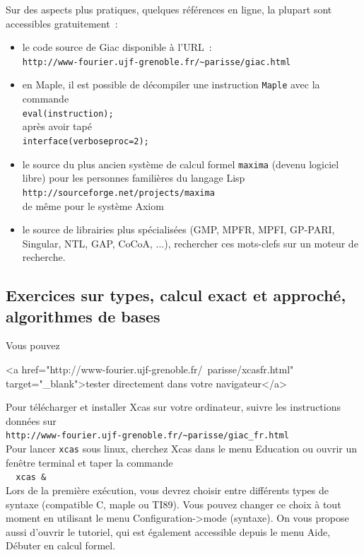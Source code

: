 \documentclass[a4paper,11pt]{article}
\begin{document}
\begin{giacjshere}
Sur des aspects plus pratiques, quelques r\'ef\'erences en ligne, 
la plupart sont accessibles  gratuitement~:
\begin{itemize}
\item le code source de Giac disponible à l'URL~:\\
\verb|http://www-fourier.ujf-grenoble.fr/~parisse/giac.html|
\item en Maple, il est possible de
décompiler une instruction \verb|Maple| avec la commande\\
\verb|eval(instruction);|\\
après avoir tapé\\
\verb|interface(verboseproc=2);|
\item le source du plus ancien système de calcul formel \verb|maxima|
(devenu logiciel libre) pour les personnes famili\`eres du langage Lisp\\
\verb|http://sourceforge.net/projects/maxima|\\
de m\^eme pour le syst\`eme Axiom
\item le source de librairies plus spécialisées (GMP, MPFR, MPFI, GP-PARI, Singular,
NTL, GAP, CoCoA, ...), rechercher ces mots-clefs sur un moteur de recherche.
\end{itemize}

\pagebreak

\subsection{Exercices  sur types, calcul exact et approch\'e, 
algorithmes  de  bases} \label{sec:exos_algobase}
Vous pouvez 
\begin{rawhtml}
<a href="http://www-fourier.ujf-grenoble.fr/~parisse/xcasfr.html" target="_blank">tester directement dans votre navigateur</a>
\end{rawhtml}
Pour t\'el\'echarger et installer Xcas sur votre ordinateur, suivre
les instructions donn\'ees sur\\
\verb|http://www-fourier.ujf-grenoble.fr/~parisse/giac_fr.html|\\
Pour lancer {\tt xcas} sous linux, cherchez Xcas dans le menu
Education ou ouvrir un fen\^etre terminal et
taper la commande\\
\verb|  xcas & |\\
Lors de la premi\`ere ex\'ecution, vous devrez choisir entre
diff\'erents types de syntaxe (compatible C, maple ou TI89). Vous
pouvez changer ce choix \`a tout moment en utilisant le menu
Configuration->mode (syntaxe). On vous propose aussi d'ouvrir le
tutoriel, qui est \'egalement accessible depuis le menu Aide,
D\'ebuter en calcul formel.


\end{giacjshere}
\end{document}
